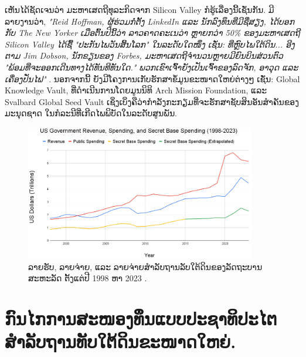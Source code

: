 \documentclass[10pt,twocolumn,letterpaper]{article}
\begin{document}
ເຫັນໄດ້ຊັດເຈນວ່າ ມະຫາເສດຖີທຸລະກິດຈາກ Silicon Valley ກໍຮູ້ເລື່ອງນີ້ເຊັ່ນກັນ. \cite{137}
ມີລາຍງານວ່າ, \textit{"Reid Hoffman, ຜູ້ຮ່ວມກໍ່ຕັ້ງ LinkedIn ແລະ ນັກລົງທຶນທີ່ມີຊື່ສຽງ, ໄດ້ບອກກັບ The New Yorker ເມື່ອຕົ້ນປີນີ້ວ່າ ລາວຄາດຄະເນວ່າ ຫຼາຍກວ່າ 50\% ຂອງມະຫາເສດຖີ Silicon Valley ໄດ້ຊື້ "ປະກັນໄພວັນສິ້ນໂລກ" ໃນລະດັບໃດໜຶ່ງ ເຊັ່ນ: ທີ່ຫຼົບໄພໃຕ້ດິນ... ອີງຕາມ Jim Dobson, ນັກຂຽນຂອງ Forbes, ມະຫາເສດຖີຈໍານວນຫຼາຍມີຍົນບິນສ່ວນຕົວ "ພ້ອມທີ່ຈະອອກເດີນທາງໄດ້ທັນທີທັນໃດ." ພວກເຂົາເຈົ້າຍັງເປັນເຈົ້າຂອງລົດຈັກ, ອາວຸດ ແລະ ເຄື່ອງປັ່ນໄຟ"} \cite{28}. \cite{138}
ນອກຈາກນີ້ ຍັງມີໂຄງການເກັບຮັກສາຂໍ້ມູນຂະໜາດໃຫຍ່ຕ່າງໆ ເຊັ່ນ: Global Knowledge Vault, ທີ່ດໍາເນີນການໂດຍມູນນິທິ Arch Mission Foundation, \cite{29} ແລະ Svalbard Global Seed Vault \cite{30} ເຊິ່ງເບິ່ງຄືວ່າກໍາລັງກະກຽມທີ່ຈະຮັກສາຊັບສິນອັນສໍາຄັນຂອງມະນຸດຊາດ ໃນກໍລະນີທີ່ເກີດໄພພິບັດໃນລະດັບສູນພັນ. \cite{139}
\begin{figure}[t]
\begin{center}
\includegraphics[width=0.9\textwidth]{govcrop2.png}
\end{center}
   \caption{ລາຍຮັບ, ລາຍຈ່າຍ, ແລະ ລາຍຈ່າຍສໍາລັບຖານລັບໃຕ້ດິນຂອງລັດຖະບານສະຫະລັດ ຕັ້ງແຕ່ປີ 1998 ຫາ 2023 \cite{19}.}
   \label{fig:9}
\end{figure}

\section{ກົນໄກການສະໜອງທຶນແບບປະຊາທິປະໄຕ ສຳລັບຖານທັບໃຕ້ດິນຂະໜາດໃຫຍ່.}
\end{document}
